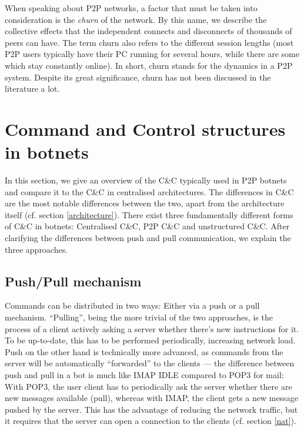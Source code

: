 \documentclass{llncs}
\begin{document}
When speaking about P2P networks, a factor that must be taken into
consideration is the {\it churn} of the network. By this name, we
describe the collective effects that the independent connects and
disconnects of thousands of peers can have. The term churn also refers
to the different session lengths (most P2P users typically have their
PC running for several hours, while there are some which stay
constantly online). In short, churn stands for the dynamics in a P2P
system. Despite its great significance, churn has not been discussed
in the literature a lot. \cite{stutzbach2006understanding}

\section{Command and Control structures in botnets}
In this section, we give an overview of the C\&C typically used in P2P
botnets and compare it to the C\&C in centralised architectures. The
differences in C\&C are the most notable differences between the two,
apart from the architecture itself (cf. section \ref{architecture}). There
exist three fundamentally different forms of C\&C in botnets:
Centralised C\&C, P2P C\&C and unstructured C\&C. After clarifying the
differences between push and pull communication, we explain the three
approaches.


\subsection{Push/Pull mechanism}
\label{pushpull}
Commands can be distributed in two ways: Either via a push or a pull
mechanism. ``Pulling'', being the more trivial of the two approaches,
is the process of a client actively asking a server whether there's
new instructions for it. To be up-to-date, this has to be performed
periodically, increasing network load.  Push on the other hand is
technically more advanced, as commands from the server will be
automatically ``forwarded'' to the clients --- the difference between
push and pull in a bot is much like IMAP IDLE compared to POP3 for
mail: With POP3, the user client has to periodically ask the server
whether there are new messages available (pull), whereas with IMAP,
the client gets a new message pushed by the server. This has the
advantage of reducing the network traffic, but it requires that the
server can open a connection to the clients (cf. section \ref{nat}).
\end{document}
